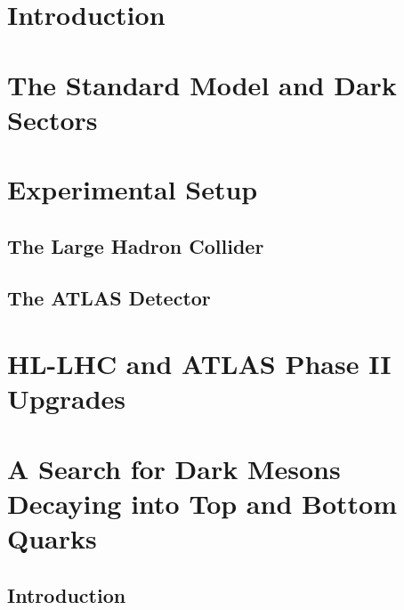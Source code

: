 \chapter{Introduction}
\label{ch:introduction}



\chapter{The Standard Model and Dark Sectors}
\label{ch:theory}
% 


\chapter{Experimental Setup}\label{ch:experimental_setup}

\section{The Large Hadron Collider}\label{sec:lhc}

\section{The ATLAS Detector}\label{sec:atlas_detector}


\chapter{HL-LHC and ATLAS Phase II Upgrades}\label{ch:hl-lhc-atlas-upgrades}


\chapter{A Search for Dark Mesons Decaying into Top and Bottom Quarks}\label{ch:dark_mesons}

\section{Introduction}\label{sec:dark_meson_intro}

